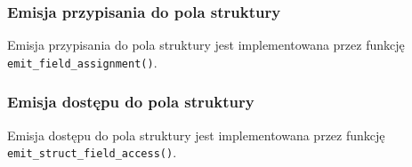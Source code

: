 \subsubsection{Emisja przypisania do pola struktury}

Emisja przypisania do pola struktury jest implementowana przez funkcję
\texttt{emit\_field\_assignment()}.

\subsubsection{Emisja dostępu do pola struktury}

Emisja dostępu do pola struktury jest implementowana przez funkcję
\texttt{emit\_struct\_field\_access()}.

